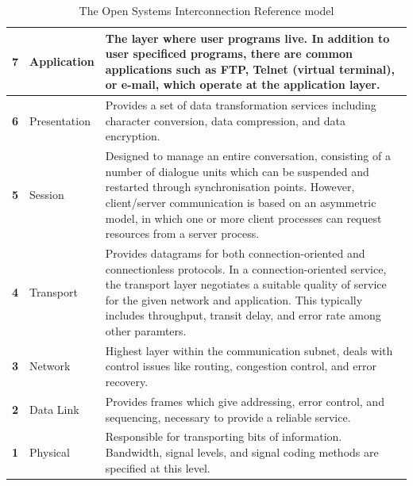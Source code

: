 \documentclass[12pt, a4paper, twoside, onecolumn]{article}
\begin{document}
\begin{table}[!ht]
  \begin{center}
    \begin{tabularx}{\textwidth}{|c|l|X|}
      \hline
      \textbf{7} & Application & The layer where user programs live. In addition to user specificed programs, there are common applications such as FTP, Telnet (virtual terminal), or e-mail, which operate at the application layer. \\ \hline
      \textbf{6} & Presentation & Provides a set of data transformation services including character conversion, data compression, and data encryption. \\ \hline
      \textbf{5} & Session & Designed to manage an entire conversation, consisting of a number of dialogue units which can be suspended and restarted through synchronisation points. However, client/server communication is based on an asymmetric model, in which one or more client processes can request resources from a server process. \\ \hline
      \textbf{4} & Transport & Provides datagrams for both connection-oriented and connectionless protocols. In a connection-oriented service, the transport layer negotiates a suitable quality of service for the given network and application. This typically includes throughput, transit delay, and error rate among other paramters. \\ \hline
      \textbf{3} & Network & Highest layer within the communication subnet, deals with control issues like routing, congestion control, and error recovery. \\ \hline
      \textbf{2} & Data Link & Provides frames which give addressing, error control, and sequencing, necessary to provide a reliable service. \\ \hline
      \textbf{1} & Physical & Responsible for transporting bits of information. Bandwidth, signal levels, and signal coding methods are specified at this level. \\ \hline
    \end{tabularx}
  \end{center}
\caption{The Open Systems Interconnection Reference model \cite{networks01}}
\label{osi_model}
\end{table}
\end{document}
